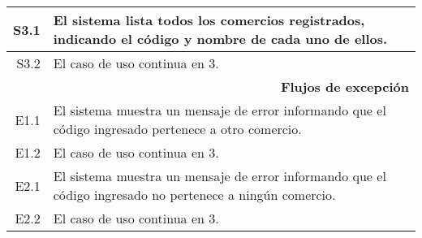\begin{tabularx}{\textwidth}{| r | X |}
\hline
S3.1 & El sistema lista todos los comercios registrados, indicando el código y
nombre de cada uno de ellos. \\
\hline
S3.2 & El caso de uso continua en 3. \\

\hline
\multicolumn{2}{|X|}{
\textbf{Flujos de excepción}} \\

\hline
E1.1 & El sistema muestra un mensaje de error informando que el código
ingresado pertenece a otro comercio. \\
\hline
E1.2 & El caso de uso continua en 3. \\

\hline
E2.1 & El sistema muestra un mensaje de error informando que el código
ingresado no pertenece a ningún comercio. \\
\hline
E2.2 & El caso de uso continua en 3. \\

\hline
\end{tabularx}


